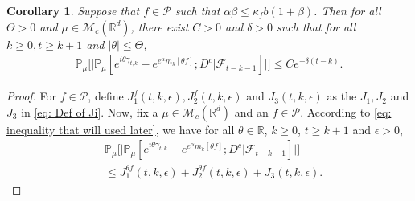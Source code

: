 \documentclass[12pt,a4paper]{amsart}
\theoremstyle{plain}
\newtheorem{cor}[thm]{Corollary}
\theoremstyle{definition}
\numberwithin{equation}{section}
\begin{document}
\begin{cor}\label{cor: used in next corollary}
    Suppose that $f\in \mathcal{P}$ such that $\alpha\beta\leq \kappa_fb(1+\beta)$.
    Then for all $\Theta >0$ and $\mu\in \mathcal M_c(\mathbb R^d)$, there exist $C>0$ and $\delta>0$ such that for all $k \geq 0, t\geq k+1$ and $|\theta|\leq \Theta$,
\begin{equation}\begin{split}
    \mathbb{P}_{\mu}\Big[\big|\mathbb{P}_{\mu}[e^{i\theta\gamma_{t,k}}-e^{e^{\alpha}m_k[\theta f]}; D^c | \mathscr F_{t-k-1}]\big|\Big]
    \leq Ce^{-\delta(t-k)}.
\end{split}\end{equation}
\end{cor}
\begin{proof}
	For  $f\in \mathcal P$, define $J_1^f(t,k,\epsilon), J_2^f(t,k,\epsilon)$ and $J_3(t,k,\epsilon)$ as the $J_1, J_2$ and $J_3$ in \eqref{eq: Def of Ji}.
	Now, fix a $\mu \in \mathcal M_c(\mathbb R^d)$ and an $f\in \mathcal P$.
    According to \eqref{eq: inequality that will used later},  we have for all $\theta\in \mathbb R$, $k\geq 0$, $t\geq k+1$ and $\epsilon> 0$,
\begin{equation}\begin{split}
    &\mathbb{P}_{\mu}\Big[\big| \mathbb{P}_{\mu}[e^{i\theta \gamma_{t,k}}-e^{e^{\alpha}m_k[\theta f]}; D^c | \mathscr F_{t-k-1}]\big|\Big]
    \\&\leq J^{\theta f}_1(t,k,\epsilon) + J^{\theta f}_2(t,k,\epsilon)+J_3(t,k,\epsilon).
\end{split}\end{equation}


\end{proof}
\end{document}
